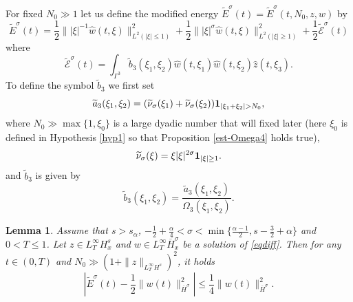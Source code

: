 \documentclass{amsart}
\newtheorem{lemma}[theorem]{Lemma}
\theoremstyle{definition}
\theoremstyle{remark}
\numberwithin{equation}{section}
\begin{document}
For fixed $N_0\gg 1$ let us define the modified energy $\widetilde{E}^\sigma(t) = \widetilde{E}^\sigma(t,N_0,z,w) $ by
\begin{equation}\label{def:esigma}
  \widetilde{E}^\sigma(t) = \frac 12\||\xi|^{-1}\widehat{w}(t,\xi)\|_{L^2(|\xi|\le 1)}^2 + \frac 12\||\xi|^{\sigma}\widehat{w}(t,\xi)\|_{L^2(|\xi| \ge 1)}^2+\frac 12 \widetilde{\mathcal{E}}^\sigma(t)
\end{equation}
where
$$
\widetilde{\mathcal{E}}^\sigma(t) = \int_{\Gamma^3}\widetilde{b}_3(\xi_1,\xi_2) \widehat{w}(t,\xi_1) \widehat{w}(t,\xi_2)\widehat{z}(t,\xi_3).
$$
To define the symbol $\widetilde{b}_3$ we first set
\begin{equation}\label{def:a3tilde}
\widetilde{a}_3(\xi_1,\xi_2) = (\widetilde{\nu}_\sigma(\xi_1) + \widetilde{\nu}_\sigma(\xi_2)){\bf 1}_{|\xi_1+\xi_2|>N_0},
\end{equation}
where $N_0 \gg \max\{1,\xi_0\}$ is a large dyadic number that will fixed later (here $\xi_0$ is defined in Hypothesis \ref{hyp1} so that Proposition \ref{est-Omega4} holds true),
\begin{equation} \label{def:tilde_nu}\widetilde{\nu}_\sigma(\xi)=\xi|\xi|^{2\sigma} {\bf 1}_{|\xi|\ge 1} . 
\end{equation} 
 and $\widetilde{b}_3$ is given by
$$
\widetilde{b}_3(\xi_1,\xi_2) = \frac{\widetilde{a}_3(\xi_1,\xi_2)}{\Omega_3(\xi_1,\xi_2)}.
$$
\begin{lemma} \label{coer:E_tilde_sigma}
  Assume that $s>s_\alpha$, $-\frac 1 2 +\frac \alpha 4< \sigma<\min \{\frac{\alpha-1}2,s-\frac 32+ \alpha\}$ and $0<T\le 1$. Let $z\in L^\infty_TH^s_x$ and $w\in L^\infty_T\overline{H}^\sigma_x$ be a solution of \eqref{eqdiff}. Then for any $t\in (0,T)$ and $N_0\gg (1+\|z\|_{L^\infty_TH^s})^2$, it holds
  \begin{equation}\label{coesive-diff}
    \left| \widetilde{E}^{\sigma}(t) - \frac 12\|w(t)\|_{\overline{H}^\sigma}^2\right|\le \frac 14 \|w(t)\|_{\overline{H}^\sigma}^2.
  \end{equation}
\end{lemma}
\end{document}
